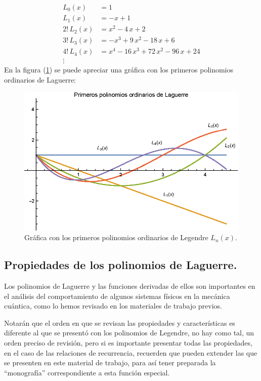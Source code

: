 \begin{align*}
L_{0} (x) &= 1 \\[0.5em]
L_{1} (x) &= -x + 1 \\[0.5em]
2! \, L_{2} (x) &= x^{2} - 4 \, x + 2 \\[0.5em]
3! \, L_{3} (x) &= -x^{3} + 9 \, x^{2} - 18 \, x + 6 \\[0.5em]
4! \, L_{4} (x) &= x^{4} -16 \, x^{3} + 72 \, x^{2} - 96 \, x + 24 \\[0.5em]
\vdots
\end{align*}
En la figura (\ref{fig:grafica_Laguerre_01}) se puede apreciar una gráfica con los primeros polinomios ordinarios de Laguerre:
\begin{figure}[H]
    \centering
    \includegraphics[scale=1]{Imagenes/Polinomios_Laguerre_03.eps}
    \caption{Gráfica con los primeros polinomios ordinarios de Legendre $L_{n}(x)$.}
    \label{fig:grafica_Laguerre_01}
\end{figure}

\subsection{Propiedades de los polinomios de Laguerre.}
Los polinomios de Laguerre y las funciones derivadas de ellos son importantes en el análisis del comportamiento de algunos sistemas físicos en la mecánica cuántica, como lo hemos revisado en los materiales de trabajo previos.
\par
Notarán que el orden en que se revisan las propiedades y características es diferente al que se presentó con los polinomios de Legendre, no hay como tal, un orden preciso de revisión, pero si es importante presentar todas las propiedades, en el caso de las relaciones de recurrencia, recuerden que pueden extender las que se presenten en este material de trabajo, para así tener preparada la \enquote{monografía} correspondiente a esta función especial.
